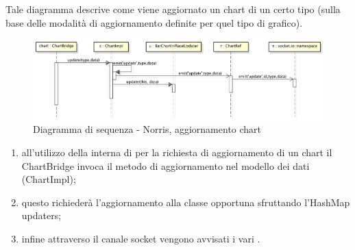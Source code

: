             Tale diagramma descrive come viene aggiornato un chart di un certo tipo (sulla base delle modalità di aggiornamento definite per quel tipo di grafico).
            \begin{figure}[H]
                \centering
                \includegraphics[scale=0.3]{DefinizioneDiProdotto/Pics/NorrisAggiornamentoChart}
                \caption{Diagramma di sequenza - Norris, aggiornamento chart}
            \end{figure}
            \begin{enumerate}
                \item all'utilizzo della  interna di  per la richiesta di aggiornamento di un chart il ChartBridge invoca il metodo di aggiornamento nel modello dei dati (ChartImpl);
                \item questo richiederà l'aggiornamento alla classe opportuna sfruttando l'HashMap updaters;
                \item infine attraverso il canale socket vengono avvisati i vari .
            \end{enumerate}
